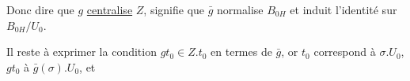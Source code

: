 Donc dire que $g$ \uline{centralise} $Z$, signifie que $\bar g$ normalise $B_{0H}$ et induit l'identité sur $B_{0H}/U_0$.

Il reste à exprimer la condition $gt_0\in Z.t_0$ en termes de $\bar g$, or  $t_0$ correspond à $\sigma.U_0$, $gt_0$ à $\bar g(\sigma).U_0$, et  

